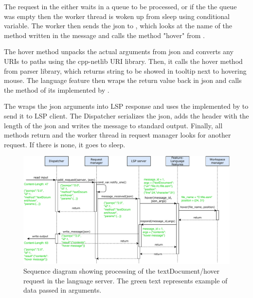 The request in the  either waits in a queue to be processed, or if the the queue was empty then the worker thread is woken up from sleep using conditional variable. The worker then sends the json to , which looks at the name of the method written in the message and calls the method "hover" from .

The hover method unpacks the actual arguments from json and converts any URIs to paths using the cpp-netlib URI library. Then, it calls the hover method from parser library, which returns string to be showed in tooltip next to hovering mouse. The language feature then wraps the return value back in json and calls the  method of its  implemented by .

The  wraps the json arguments into LSP response and uses the  implemented by  to send it to LSP client. The Dispatcher serializes the json, adds the header with the length of the json and writes the message to standard output. Finally, all methods return and the worker thread in request manager looks for another request. If there is none, it goes to sleep.

\begin{landscape}
	\begin{figure}
		\centering
		\includegraphics[width=21cm]{img/hover_sequence}
		\caption{Sequence diagram showing processing of the textDocument/hover request in the language server. The green text represents example of data passed in arguments.}
		\label{hover_sequence}
	\end{figure}
\end{landscape}


